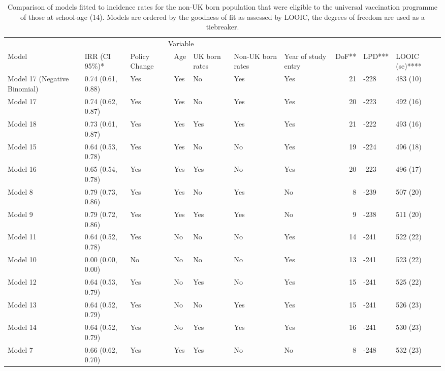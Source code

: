 \documentclass[11pt,twoside]{bristolthesis}
\begin{document}
  \begin{landscape}\begin{table}[!h]
  
  \caption{\label{tab:07-summary-universal-nonukborn}Comparison of models fitted to incidence rates for the non-UK born population that were eligible to the universal vaccination programme of those at school-age (14). Models are ordered by the goodness of fit as assessed by LOOIC, the degrees of freedom are used as a tiebreaker.}
  \centering
  \fontsize{8}{10}\selectfont
  \begin{tabular}{>{\raggedright\arraybackslash}p{3cm}llllllrll}
  \toprule
  \multicolumn{2}{c}{ } & \multicolumn{5}{c}{Variable} & \multicolumn{3}{c}{ } \\
  \cmidrule(l{3pt}r{3pt}){3-7}
  Model & IRR (CI 95\%)* & Policy Change & Age & UK born rates & Non-UK born rates & Year of study entry & DoF** & LPD*** & LOOIC (se)****\\
  \midrule
  Model 17 (Negative Binomial) & 0.74 (0.61, 0.88) & Yes & Yes & No & Yes & Yes & 21 & -228 & 483 (10)\\
  Model 17 & 0.74 (0.62, 0.87) & Yes & Yes & No & Yes & Yes & 20 & -223 & 492 (16)\\
  Model 18 & 0.73 (0.61, 0.87) & Yes & Yes & Yes & Yes & Yes & 21 & -222 & 493 (16)\\
  Model 15 & 0.64 (0.53, 0.78) & Yes & Yes & No & No & Yes & 19 & -224 & 496 (18)\\
  Model 16 & 0.65 (0.54, 0.78) & Yes & Yes & Yes & No & Yes & 20 & -223 & 496 (17)\\
  \addlinespace
  Model 8 & 0.79 (0.73, 0.86) & Yes & Yes & No & Yes & No & 8 & -239 & 507 (20)\\
  Model 9 & 0.79 (0.72, 0.86) & Yes & Yes & Yes & Yes & No & 9 & -238 & 511 (20)\\
  Model 11 & 0.64 (0.52, 0.78) & Yes & No & No & No & Yes & 14 & -241 & 522 (22)\\
  Model 10 & 0.00 (0.00, 0.00) & No & No & No & No & Yes & 13 & -241 & 523 (22)\\
  Model 12 & 0.64 (0.53, 0.79) & Yes & No & Yes & No & Yes & 15 & -241 & 525 (22)\\
  \addlinespace
  Model 13 & 0.64 (0.52, 0.79) & Yes & No & No & Yes & Yes & 15 & -241 & 526 (23)\\
  Model 14 & 0.64 (0.52, 0.79) & Yes & No & Yes & Yes & Yes & 16 & -241 & 530 (23)\\
  Model 7 & 0.66 (0.62, 0.70) & Yes & Yes & Yes & No & No & 8 & -248 & 532 (23)\\

\end{tabular}
\end{table}
\end{landscape}
\end{document}
